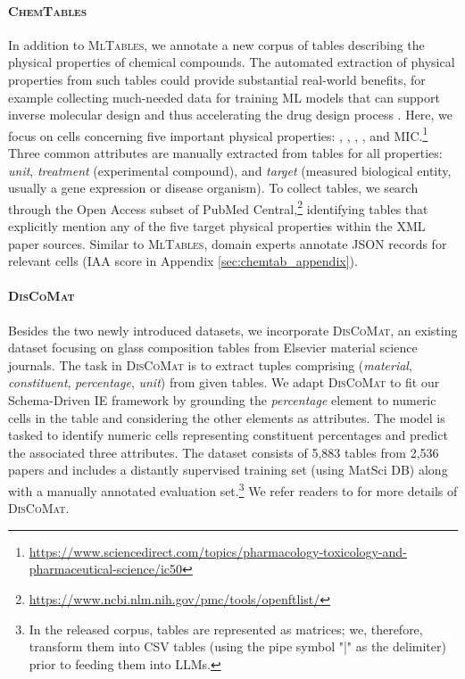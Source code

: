 \documentclass[11pt]{article}
\newcommand\data{\textsc{MlTables}}
\newcommand{\chemtables}{\textsc{ChemTables}}
\newcommand{\discomat}{\textsc{DisCoMat}}
\begin{document}
\paragraph{\chemtables{}} In addition to \data{}, we annotate a new corpus of tables describing the physical properties of chemical compounds. The automated extraction of physical properties from such tables could provide substantial real-world benefits, for example collecting much-needed data for training ML models that can support inverse molecular design \citep{kim2018deep} and thus accelerating the drug design process \citep{Fields19,STOKES2020688}. 
Here, we focus on cells concerning five important physical properties: \icfifty{}, , , , and MIC.\footnote{\url{https://www.sciencedirect.com/topics/pharmacology-toxicology-and-pharmaceutical-science/ic50}}
Three common attributes are manually extracted from tables for all properties: \emph{unit}, \emph{treatment} (experimental compound), and \emph{target} (measured biological entity, usually a gene expression or disease organism). 
To collect tables, we search through the Open Access subset of PubMed Central,\footnote{\url{https://www.ncbi.nlm.nih.gov/pmc/tools/openftlist/}} identifying tables that explicitly mention any of the five target physical properties within the XML paper sources. 
Similar to \data{}, domain experts annotate JSON records for relevant cells (IAA score in Appendix \ref{sec:chemtab_appendix}).
















\paragraph{\discomat{} \citep{gupta2022discomat}} Besides the two newly introduced datasets, we incorporate \discomat{}, an existing dataset focusing on glass composition tables from Elsevier material science journals. The task in \discomat{} is to extract tuples comprising (\textit{material}, \textit{constituent}, \textit{percentage}, \textit{unit}) from given tables. We adapt \discomat{} to fit our Schema-Driven IE framework by grounding the \textit{percentage} element to numeric cells in the table and considering the other elements as attributes. The model is tasked to identify numeric cells representing constituent percentages and predict the associated three attributes. The dataset consists of 5,883 tables from 2,536 papers and includes a distantly supervised training set (using MatSci DB) along with a manually annotated evaluation set.\footnote{In the released corpus, tables are represented as matrices; we, therefore, transform them into CSV tables (using the pipe symbol "|" as the delimiter) prior to feeding them into LLMs.} We refer readers to \citet{gupta2022discomat} for more details of \discomat{}.
\end{document}
